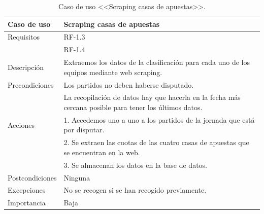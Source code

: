 \begin{table}
  \begin{center}
   \begin{tabular}{|p{3cm} | p{9cm} |}
    \hline
    Caso de uso & Scraping casas de apuestas\\
    \hline
    Requisitos & RF-1.3\\
    & RF-1.4\\
    \hline
    Descripción & Extraemos los datos de la clasificación para cada uno de los equipos mediante web scraping.\\
    \hline
    Precondiciones &Los partidos no deben haberse disputado.\\
    &La recopilación de datos hay que hacerla en la fecha más cercana posible para tener los últimos datos.\\
    \hline
  	Acciones & 1. Accedemos uno a uno a los partidos de la jornada que está por disputar. \\
    &2. Se extraen las cuotas de las cuatro casas de apuestas que se encuentran en la web.\\
    &3. Se almacenan los datos en la base de datos.\\
    \hline
    Postcondiciones & Ninguna \\
    \hline
    Excepciones & No se recogen si se han recogido previamente.\\
    \hline
    Importancia & Baja \\
    \hline
   \end{tabular}
   \caption{Caso de uso <<Scraping casas de apuestas>>.}
   \label{tabla:casoUso1.4}
  \end{center}
 \end{table} 


